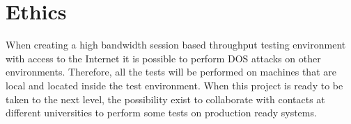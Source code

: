 \section{Ethics}
When creating a high bandwidth session based throughput testing environment with access to the Internet it is possible to perform DOS attacks on other environments. 
Therefore, all the tests will be performed on machines that are local and located inside the test environment. 
When this project is ready to be taken to the next level, the possibility exist to collaborate with contacts at different universities to perform some tests on production ready systems.   
